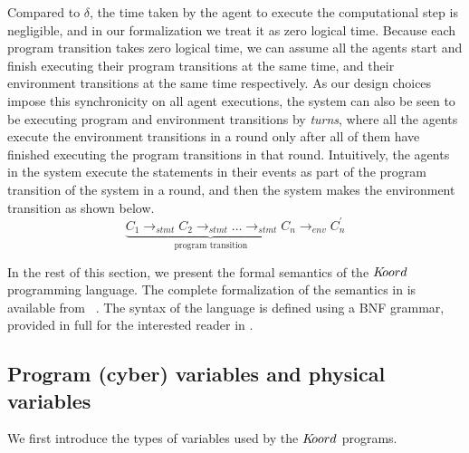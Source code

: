 
Compared to $\delta$, the time taken by the agent to execute the computational step is negligible, and in our formalization we treat it as zero logical time. Because each program transition takes zero logical time, we can assume all the agents start and finish executing their program transitions at the same time, and their environment transitions at the same time respectively. As our design choices impose this synchronicity on all agent executions, the system can also be seen to be executing program and environment transitions by \emph{turns}, where all the agents execute the environment transitions in a round only after all of them have finished executing the program transitions in that round. Intuitively, the agents in the system execute the statements in their events as part of the program transition of the system in a round, and then the system makes the environment transition as shown below. 
$$
\underbrace{C_1\rightarrow_{stmt} C_2\rightarrow_\mathit{stmt}\ldots \rightarrow_{stmt}C_n}_{\mbox{program transition}}\rightarrow_\mathit{env} C^\prime_n
$$


 In the rest of this section, we present the formal semantics of the $K\kern-2pt oord$ programming language. The complete formalization of the semantics in \K is available from~\cite{} . The syntax of the language is defined using a BNF grammar, provided in full for the interested reader in .
 
\subsection{Program (cyber) variables and physical variables}
\label{sec:variables}
We first introduce the types of variables used by the $K\kern-2pt oord$ programs. 


